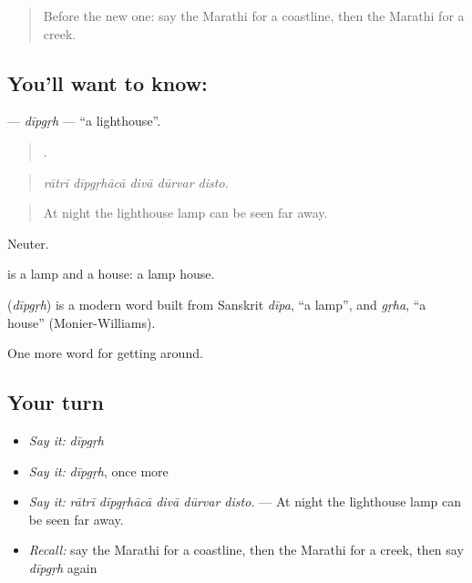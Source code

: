\label{lesson:MR-C410-dipgrh}



\begin{quote}
Before the new one: say the Marathi for a coastline, then the Marathi for a creek.
\end{quote}

\subsection*{You'll want to know: }
\textbf{} — \emph{dīpgṛh} — \textquotedblleft{}a lighthouse\textquotedblright{}.

\begin{quote}
    .
\end{quote}

\begin{quote}
\emph{rātrī dīpgṛhācā divā dūrvar disto.}
\end{quote}

\begin{quote}
At night the lighthouse lamp can be seen far away.
\end{quote}

Neuter.

 is a lamp and  a house: a lamp house.

\begin{cousinweb}
\textbf{} (\emph{dīpgṛh}) is a modern word built from Sanskrit \emph{dīpa}, \textquotedblleft{}a lamp\textquotedblright{}, and \emph{gṛha}, \textquotedblleft{}a house\textquotedblright{} (Monier-Williams).
\end{cousinweb}

\begin{grammarlens}[title={What you've built}]
One more word for getting around.
\end{grammarlens}

\subsection*{Your turn}
\begin{itemize}
\raggedright
  \item \emph{Say it:} \emph{dīpgṛh}
  \item \emph{Say it:} \emph{dīpgṛh}, once more
  \item \emph{Say it:} \emph{rātrī dīpgṛhācā divā dūrvar disto.} — At night the lighthouse lamp can be seen far away.
  \item \emph{Recall:} say the Marathi for a coastline, then the Marathi for a creek, then say \emph{dīpgṛh} again
\end{itemize}

